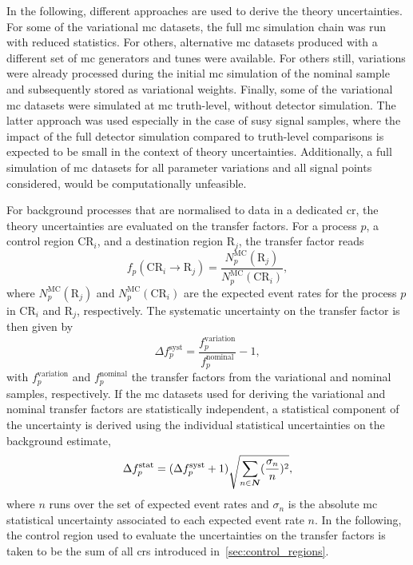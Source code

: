 In the following, different approaches are used to derive the theory uncertainties.
For some of the variational \gls{mc} datasets, the full \gls{mc} simulation chain was run with reduced statistics.
For others, alternative \gls{mc} datasets produced with a different set of \gls{mc} generators and tunes were available.
For others still, variations were already processed during the initial \gls{mc} simulation of the nominal sample and subsequently stored as variational weights.
Finally, some of the variational \gls{mc} datasets were simulated at \gls{mc} truth-level, \ie without detector simulation.
The latter approach was used especially in the case of \gls{susy} signal samples, where the impact of the full detector simulation compared to truth-level comparisons is expected to be small in the context of theory uncertainties.
Additionally, a full simulation of \gls{mc} datasets for all parameter variations and all signal points considered, would be computationally unfeasible. 

For background processes that are normalised to data in a dedicated \gls{cr}, the theory uncertainties are evaluated on the transfer factors.
For a process $p$, a control region CR$_i$, and a destination region R$_j$, the transfer factor reads
\begin{equation}
	f_p(\mathrm{CR}_i\rightarrow \mathrm{R}_j) = \frac{N^\mathrm{MC}_p(\mathrm{R}_j)}{N^\mathrm{MC}_p(\mathrm{CR}_i)},
\end{equation}
where $N^\mathrm{MC}_p(\mathrm{R}_j)$ and $N^\mathrm{MC}_p(\mathrm{CR}_i)$ are the expected event rates for the process $p$ in CR$_i$ and R$_j$, respectively. The systematic uncertainty on the transfer factor is then given by
\begin{equation}
	\Delta f_p^\mathrm{syst} = \frac{f_p^\mathrm{variation}}{f_p^\mathrm{nominal}} - 1,
\end{equation}
with $f_p^\mathrm{variation}$ and $f_p^\mathrm{nominal}$ the transfer factors from the variational and nominal samples, respectively.
If the \gls{mc} datasets used for deriving the variational and nominal transfer factors are statistically independent, a statistical component of the uncertainty is derived using the individual statistical uncertainties on the background estimate,
\begin{equation}
	\Delta f_p^\mathrm{stat} = (\Delta f_p^\mathrm{syst} + 1 ) \sqrt{\sum_{n\in\makemebold{N}}(\frac{\sigma_n}{n})^2},
\end{equation}
 where $n$ runs over the set of expected event rates and $\sigma_n$ is the absolute \gls{mc} statistical uncertainty associated to each expected event rate $n$.
 In the following, the control region used to evaluate the uncertainties on the transfer factors is taken to be the sum of all \glspl{cr} introduced in~\cref{sec:control_regions}.
  
